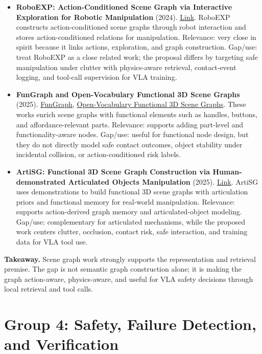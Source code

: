 \begin{itemize}
\item \textbf{RoboEXP: Action-Conditioned Scene Graph via Interactive Exploration for Robotic Manipulation} (2024). \href{https://arxiv.org/abs/2402.15487}{Link}. RoboEXP constructs action-conditioned scene graphs through robot interaction and stores action-conditioned relations for manipulation. Relevance: very close in spirit because it links actions, exploration, and graph construction. Gap/use: treat RoboEXP as a close related work; the proposal differs by targeting safe manipulation under clutter with physics-aware retrieval, contact-event logging, and tool-call supervision for VLA training.

\item \textbf{FunGraph and Open-Vocabulary Functional 3D Scene Graphs} (2025). \href{https://arxiv.org/abs/2503.07909}{FunGraph}, \href{https://arxiv.org/abs/2503.19199}{Open-Vocabulary Functional 3D Scene Graphs}. These works enrich scene graphs with functional elements such as handles, buttons, and affordance-relevant parts. Relevance: supports adding part-level and functionality-aware nodes. Gap/use: useful for functional node design, but they do not directly model safe contact outcomes, object stability under incidental collision, or action-conditioned risk labels.

\item \textbf{ArtiSG: Functional 3D Scene Graph Construction via Human-demonstrated Articulated Objects Manipulation} (2025). \href{https://arxiv.org/abs/2512.24845}{Link}. ArtiSG uses demonstrations to build functional 3D scene graphs with articulation priors and functional memory for real-world manipulation. Relevance: supports action-derived graph memory and articulated-object modeling. Gap/use: complementary for articulated mechanisms, while the proposed work centers clutter, occlusion, contact risk, safe interaction, and training data for VLA tool use.
\end{itemize}

\textbf{Takeaway.} Scene graph work strongly supports the representation and retrieval premise. The gap is not semantic graph construction alone; it is making the graph action-aware, physics-aware, and useful for VLA safety decisions through local retrieval and tool calls.

\section*{Group 4: Safety, Failure Detection, and Verification}

